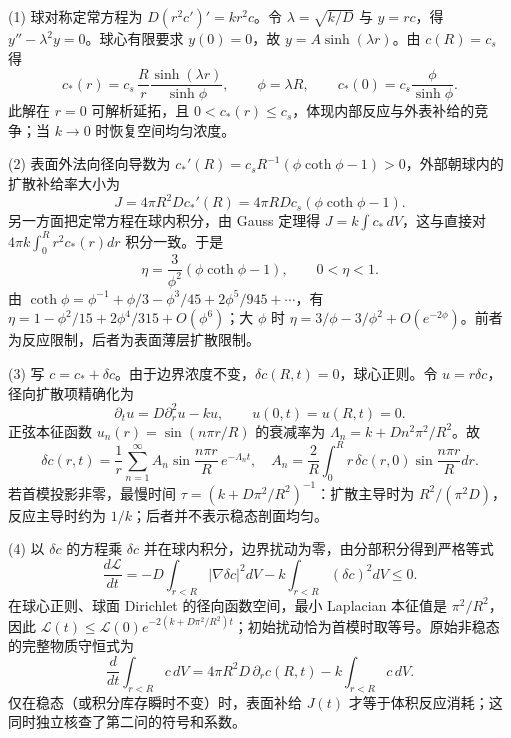 (1) 球对称定常方程为 \(D(r^2 c')'=kr^2c\)。令 \(\lambda=\sqrt{k/D}\) 与 \(y=rc\)，得 \(y''-\lambda^2y=0\)。球心有限要求 \(y(0)=0\)，故 \(y=A\sinh(\lambda r)\)。由 \(c(R)=c_s\) 得
\[
c_*(r)=c_s\,\frac{R}{r}\frac{\sinh(\lambda r)}{\sinh\phi},
\qquad \phi=\lambda R,\qquad
c_*(0)=c_s\frac{\phi}{\sinh\phi}.
\]
此解在 \(r=0\) 可解析延拓，且 \(0<c_*(r)\le c_s\)，体现内部反应与外表补给的竞争；当 \(k\to0\) 时恢复空间均匀浓度。

(2) 表面外法向径向导数为 \(c_*'(R)=c_s R^{-1}(\phi\coth\phi-1)>0\)，外部朝球内的扩散补给率大小为
\[
J=4\pi R^2D c_*'(R)=4\pi RDc_s(\phi\coth\phi-1).
\]
另一方面把定常方程在球内积分，由 Gauss 定理得 \(J=k\int c_*\,dV\)，这与直接对 \(4\pi k\int_0^R r^2c_*(r)dr\) 积分一致。于是
\[
\eta=\frac{3}{\phi^2}(\phi\coth\phi-1),\qquad 0<\eta<1.
\]
由 \(\coth\phi=\phi^{-1}+\phi/3-\phi^3/45+2\phi^5/945+\cdots\)，有
\(\eta=1-\phi^2/15+2\phi^4/315+O(\phi^6)\)；大 \(\phi\) 时
\(\eta=3/\phi-3/\phi^2+O(e^{-2\phi})\)。前者为反应限制，后者为表面薄层扩散限制。

(3) 写 \(c=c_*+\delta c\)。由于边界浓度不变，\(\delta c(R,t)=0\)，球心正则。令 \(u=r\delta c\)，径向扩散项精确化为
\[
\partial_tu=D\partial_r^2u-ku,\qquad u(0,t)=u(R,t)=0.
\]
正弦本征函数 \(u_n(r)=\sin(n\pi r/R)\) 的衰减率为
\(\Lambda_n=k+D n^2\pi^2/R^2\)。故
\[
\delta c(r,t)=\frac1r\sum_{n=1}^\infty A_n
\sin\!\frac{n\pi r}{R}\,e^{-\Lambda_n t},\quad
A_n=\frac2R\int_0^R r\,\delta c(r,0)\sin\!\frac{n\pi r}{R}dr.
\]
若首模投影非零，最慢时间 \(\tau=(k+D\pi^2/R^2)^{-1}\)：扩散主导时为 \(R^2/(\pi^2D)\)，反应主导时约为 \(1/k\)；后者并不表示稳态剖面均匀。

(4) 以 \(\delta c\) 的方程乘 \(\delta c\) 并在球内积分，边界扰动为零，由分部积分得到严格等式
\[
\frac{d\mathcal L}{dt}
=-D\int_{r<R}|\nabla\delta c|^2dV
-k\int_{r<R}(\delta c)^2dV\le0.
\]
在球心正则、球面 Dirichlet 的径向函数空间，最小 Laplacian 本征值是 \(\pi^2/R^2\)，因此
\(\mathcal L(t)\le\mathcal L(0)e^{-2(k+D\pi^2/R^2)t}\)；初始扰动恰为首模时取等号。原始非稳态的完整物质守恒式为
\[
\frac{d}{dt}\int_{r<R}c\,dV
=4\pi R^2D\,\partial_rc(R,t)-k\int_{r<R}c\,dV.
\]
仅在稳态（或积分库存瞬时不变）时，表面补给 \(J(t)\) 才等于体积反应消耗；这同时独立核查了第二问的符号和系数。